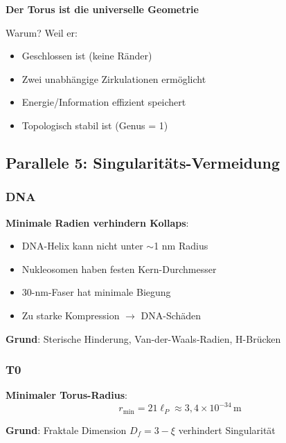 	\begin{keyresult}
		\textbf{Der Torus ist die universelle Geometrie}
		
		Warum? Weil er:
		\begin{itemize}
			\item Geschlossen ist (keine Ränder)
			\item Zwei unabhängige Zirkulationen ermöglicht
			\item Energie/Information effizient speichert
			\item Topologisch stabil ist (Genus = 1)
		\end{itemize}
	\end{keyresult}
	
	\subsection{Parallele 5: Singularitäts-Vermeidung}
	
	\subsubsection{DNA}
	
	\textbf{Minimale Radien verhindern Kollaps}:
	
	\begin{itemize}
		\item DNA-Helix kann nicht unter $\sim$1 nm Radius
		\item Nukleosomen haben festen Kern-Durchmesser
		\item 30-nm-Faser hat minimale Biegung
		\item Zu starke Kompression $\to$ DNA-Schäden
	\end{itemize}
	
	\textbf{Grund}: Sterische Hinderung, Van-der-Waals-Radien, H-Brücken
	
	\subsubsection{T0}
	
	\textbf{Minimaler Torus-Radius}:
	\begin{equation}
		r_{\min} = 21\ell_P \approx 3{,}4 \times 10^{-34}\,\text{m}
	\end{equation}
	
	\textbf{Grund}: Fraktale Dimension $D_f = 3-\xi$ verhindert Singularität
	
